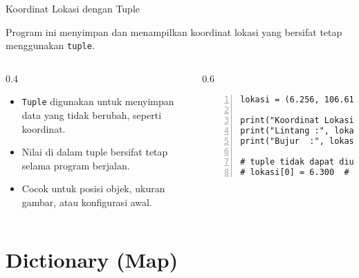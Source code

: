 \documentclass[aspectratio=169, table]{beamer}
\begin{document}
\begin{frame}[fragile]{Koordinat Lokasi dengan Tuple}
\vspace{20pt}

Program ini menyimpan dan menampilkan koordinat lokasi yang bersifat tetap menggunakan \texttt{tuple}.

\begin{columns}[T]
  \begin{column}{0.4\textwidth}
    \begin{itemize}
      \item \texttt{Tuple} digunakan untuk menyimpan data yang tidak berubah, seperti koordinat.
      \item Nilai di dalam tuple bersifat tetap selama program berjalan.
      \item Cocok untuk posisi objek, ukuran gambar, atau konfigurasi awal.
    \end{itemize}
  \end{column}

  \begin{column}{0.6\textwidth}
    \begin{lstlisting}[style=PythonStyle, numbers=left, firstnumber=1]
lokasi = (6.256, 106.618)  # koordinat Serpong

print("Koordinat Lokasi:")
print("Lintang :", lokasi[0])
print("Bujur  :", lokasi[1])

# tuple tidak dapat diubah
# lokasi[0] = 6.300  # akan menyebabkan error
    \end{lstlisting}
  \end{column}
\end{columns}

\end{frame}


\section{Dictionary (Map)}
\end{document}
